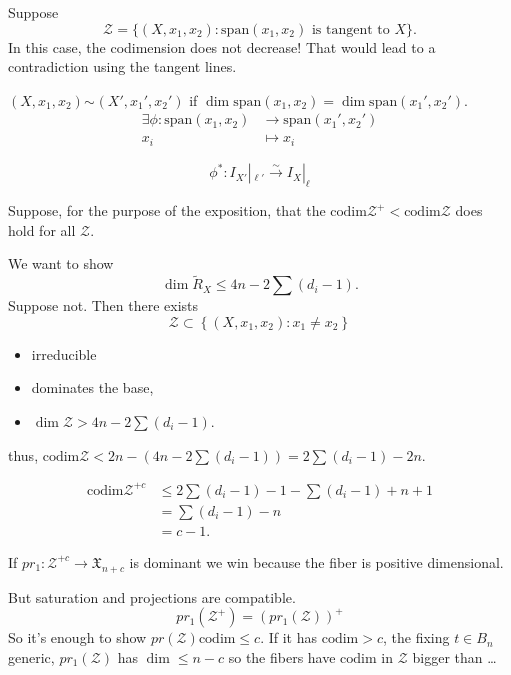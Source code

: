 \begin{example}
\label{example-another-when-fails}
Suppose
$$
\mathcal{Z} = 
\{(X,x_1,x_2)
: \text{span}(x_1,x_2)
\text{ is tangent to }X\}.
$$
In this case, the codimension
does not decrease! That 
would lead to a contradiction
using the tangent lines.
\end{example}

\begin{definition}
\label{definition-sp-equivalence}
$(X,x_1,x_2) \sim_{\text{}}
(X',x_1',x_2')$
if $\dim \text{span}(x_1,x_2)
= \dim \text{span}(x_1',x_2')$.
$$
\begin{aligned}
\exists\phi: 
\text{span}(x_1,x_2) &\longrightarrow 
\text{span}(x_1',x_2') \\
x_i &\longmapsto x_i
\end{aligned}
$$

$$
\phi^* :
I_{X'}|_{\ell'}
\xrightarrow{\sim}
I_X|_\ell
$$
\end{definition}

\noindent
Suppose, for the purpose of the
exposition, that the $\text{codim}
\mathcal{Z}^+< 
\text{codim} \mathcal{Z}$
does hold for all $\mathcal{Z}$.

We want to show
$$
\dim \tilde{R}_X
\leq  4n-2
\sum(d_i-1).
$$
Suppose not.
Then there exists
$$
\mathcal{Z}
\subset
\left\{(X,x_1,x_2):
x_1 \neq  x_2\right\}
$$
\begin{itemize}
\item irreducible
\item  dominates the base,
\item $\dim \mathcal{Z} >
4n-2 \sum (d_i-1)$.
\end{itemize}

\noindent
thus, $\text{codim}\mathcal{Z}< 2n-\left(
4n-2\sum(d_i-1)\right)
=2\sum(d_i-1)-2n$.

$$
\begin{aligned}
\text{codim}\mathcal{Z}^{+c}&\leq 
2 \sum(d_i-1)-1
-\sum(d_i-1)+n+1\\
&=\sum(d_i -1)-n\\
&=c-1.
\end{aligned}
$$

\noindent
If $pr_1:\mathcal{Z}^{+c}
\to \mathfrak{X}_{n+c}$
is dominant we win
because the fiber is positive dimensional.

But saturation and projections are
compatible.
$$
pr_1(\mathcal{Z}^+)
=(pr_1(\mathcal{Z}))^+
$$
So it's enough to show
$pr(\mathcal{Z}) \text{codim} \leq c$.
If it has $\text{codim} >c$,
the fixing $t \in B_n$
generic,
$pr_1(\mathcal{Z})$
has $\dim \leq  n-c$
so the fibers have
$\text{codim}$
in $\mathcal{Z}$ bigger than
…



